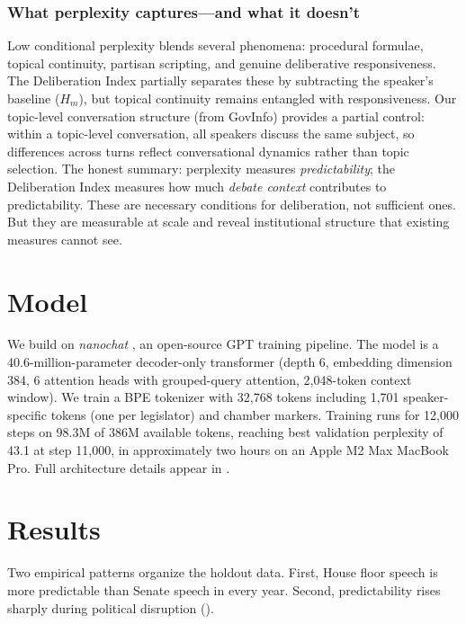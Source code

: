 \documentclass[12pt]{article}
\newcommand{\Hm}{H_m}
\begin{document}
\subsubsection*{What perplexity captures---and what it doesn't}
Low conditional perplexity blends several phenomena: procedural formulae, topical continuity, partisan scripting, and genuine deliberative responsiveness. The Deliberation Index partially separates these by subtracting the speaker's baseline ($\Hm$), but topical continuity remains entangled with responsiveness. Our topic-level conversation structure (from GovInfo) provides a partial control: within a topic-level conversation, all speakers discuss the same subject, so differences across turns reflect conversational dynamics rather than topic selection. The honest summary: perplexity measures \textit{predictability}; the Deliberation Index measures how much \textit{debate context} contributes to predictability. These are necessary conditions for deliberation, not sufficient ones. But they are measurable at scale and reveal institutional structure that existing measures cannot see.


\section{Model}

We build on \textit{nanochat} \citep{karpathy2025}, an open-source GPT training pipeline. The model is a 40.6-million-parameter decoder-only transformer (depth 6, embedding dimension 384, 6 attention heads with grouped-query attention, 2,048-token context window). We train a BPE tokenizer with 32,768 tokens including 1,701 speaker-specific tokens (one per legislator) and chamber markers. Training runs for 12,000 steps on 98.3M of 386M available tokens, reaching best validation perplexity of 43.1 at step 11,000, in approximately two hours on an Apple M2 Max MacBook Pro. Full architecture details appear in .


\section{Results}

Two empirical patterns organize the holdout data. First, House floor speech is more predictable than Senate speech in every year. Second, predictability rises sharply during political disruption ().
\end{document}

